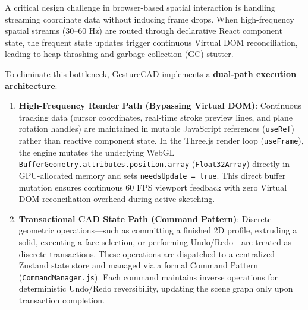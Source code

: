 A critical design challenge in browser-based spatial interaction is handling streaming coordinate data without inducing frame drops. When high-frequency spatial streams ($30$--$60\text{ Hz}$) are routed through declarative React component state, the frequent state updates trigger continuous Virtual DOM reconciliation, leading to heap thrashing and garbage collection (GC) stutter.

To eliminate this bottleneck, GestureCAD implements a \textbf{dual-path execution architecture}:

\begin{enumerate}
    \item \textbf{High-Frequency Render Path (Bypassing Virtual DOM)}: Continuous tracking data (cursor coordinates, real-time stroke preview lines, and plane rotation handles) are maintained in mutable JavaScript references (\texttt{useRef}) rather than reactive component state. In the Three.js render loop (\texttt{useFrame}), the engine mutates the underlying WebGL \texttt{BufferGeometry.attributes.position.array} (\texttt{Float32Array}) directly in GPU-allocated memory and sets \texttt{needsUpdate = true}. This direct buffer mutation ensures continuous 60 FPS viewport feedback with zero Virtual DOM reconciliation overhead during active sketching.
    \item \textbf{Transactional CAD State Path (Command Pattern)}: Discrete geometric operations---such as committing a finished 2D profile, extruding a solid, executing a face selection, or performing Undo/Redo---are treated as discrete transactions. These operations are dispatched to a centralized Zustand state store and managed via a formal Command Pattern (\texttt{CommandManager.js}). Each command maintains inverse operations for deterministic Undo/Redo reversibility, updating the scene graph only upon transaction completion.
\end{enumerate}

